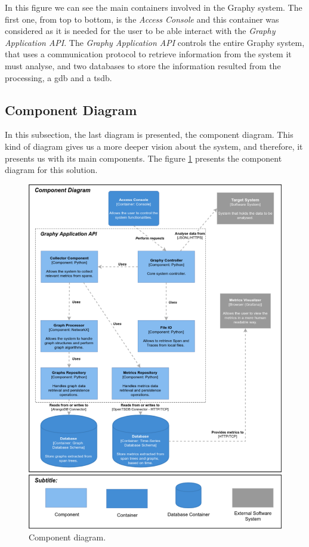 In this figure we can see the main containers involved in the Graphy system. The first one, from top to bottom, is the \textit{Access Console} and this container was considered as it is needed for the user to be able interact with the \textit{Graphy Application API}. The \textit{Graphy Application API} controls the entire Graphy system, that uses a communication protocol to retrieve information from the system it must analyse, and two databases to store the information resulted from the processing, a \gls{gdb} and a \gls{tsdb}.


\subsection{Component Diagram}
\label{subsec:component_diagram}

In this subsection, the last diagram is presented, the component diagram. This kind of diagram gives us a more deeper vision about the system, and therefore, it presents us with its main components. The figure \ref{fig:component_diagram} presents the component diagram for this solution.

\begin{figure}[!ht]
    \centering
    \includegraphics[width=1.00\textwidth]{images/component_diagram.pdf}
    \caption{Component diagram.}
    \label{fig:component_diagram}
\end{figure}


